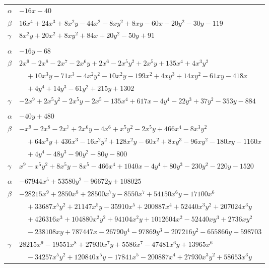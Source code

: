 \documentclass[11pt]{article}
\begin{document}
\begin{longtable}{@{}ll@{}}
$\alpha$ & $-16x-40$\\
$\beta$ & $16x^{4}+24x^{3}+8x^{2}y-44x^{2}-8xy^{2}+8xy-60x-20y^{2}-30y-119$\\
$\gamma$ & $8x^{2}y+20x^{2}+8xy^{2}+84x+20y^{2}-50y+91$\\
\addlinespace[3pt]
\multicolumn{2}{@{}l}{$\{i,j\}=\{27,37\}$, $k_{ij}=2^{2}\cdot 5^{2}\cdot 17$}\\
$\alpha$ & $-16y-68$\\
$\beta$ & $2x^{9}-2x^{8}-2x^{7}-2x^{6}y+2x^{6}-2x^{5}y^{2}+2x^{5}y+135x^{4}+4x^{3}y^{2}$\\
 & $\quad +10x^{3}y-71x^{3}-4x^{2}y^{2}-10x^{2}y-199x^{2}+4xy^{3}+14xy^{2}-61xy-418x$\\
 & $\quad +4y^{4}+14y^{3}-61y^{2}+215y+1302$\\
$\gamma$ & $-2x^{9}+2x^{5}y^{2}-2x^{5}y-2x^{5}-135x^{4}+617x-4y^{4}-22y^{3}+37y^{2}-353y-884$\\
\addlinespace[3pt]
\multicolumn{2}{@{}l}{$\{i,j\}=\{28,31\}$, $k_{ij}=2^{6}\cdot 5\cdot 11$}\\
$\alpha$ & $-40y+480$\\
$\beta$ & $-x^{9}-2x^{8}-2x^{7}+2x^{6}y-4x^{6}+x^{5}y^{2}-2x^{5}y+466x^{4}-8x^{3}y^{2}$\\
 & $\quad +64x^{3}y+436x^{3}-16x^{2}y^{2}+128x^{2}y-60x^{2}+8xy^{3}-96xy^{2}-180xy-1160x$\\
 & $\quad +4y^{4}-48y^{3}-90y^{2}-80y-800$\\
$\gamma$ & $x^{9}-x^{5}y^{2}+8x^{5}y-8x^{5}-466x^{4}+1040x-4y^{4}+80y^{3}-230y^{2}-220y-1520$\\
\addlinespace[3pt]
\multicolumn{2}{@{}l}{$\{i,j\}=\{28,39\}$, $k_{ij}=2^{4}\cdot 5\cdot 7$}\\
$\alpha$ & $-67944x^{5}+53580y^{2}-96672y+108025$\\
$\beta$ & $-28215x^{9}+2850x^{8}+28500x^{7}y-8550x^{7}+54150x^{6}y-17100x^{6}$\\
 & $\quad +33687x^{5}y^{2}+21147x^{5}y-35910x^{5}+200887x^{4}+52440x^{3}y^{2}+207024x^{3}y$\\
 & $\quad +426316x^{3}+104880x^{2}y^{2}+94104x^{2}y+1012604x^{2}-52440xy^{3}+2736xy^{2}$\\
 & $\quad -238108xy+787447x-26790y^{4}-97869y^{3}-207216y^{2}-655866y+598703$\\
$\gamma$ & $28215x^{9}-19551x^{8}+27930x^{7}y+5586x^{7}-47481x^{6}y+13965x^{6}$\\
 & $\quad -34257x^{5}y^{2}+120840x^{5}y-17841x^{5}-200887x^{4}+27930x^{3}y^{2}+58653x^{3}y$\\

\end{longtable}
\end{document}

